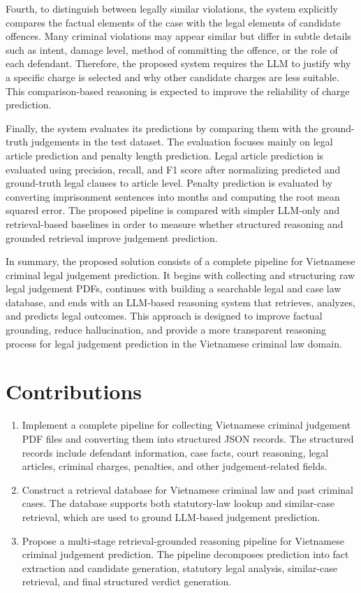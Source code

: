 \documentclass[../main.tex]{subfiles}
\begin{document}
Fourth, to distinguish between legally similar violations, the system explicitly compares the factual elements of the case with the legal elements of candidate offences. Many criminal violations may appear similar but differ in subtle details such as intent, damage level, method of committing the offence, or the role of each defendant. Therefore, the proposed system requires the LLM to justify why a specific charge is selected and why other candidate charges are less suitable. This comparison-based reasoning is expected to improve the reliability of charge prediction.

Finally, the system evaluates its predictions by comparing them with the ground-truth judgements in the test dataset. The evaluation focuses mainly on legal article prediction and penalty length prediction. Legal article prediction is evaluated using precision, recall, and F1 score after normalizing predicted and ground-truth legal clauses to article level. Penalty prediction is evaluated by converting imprisonment sentences into months and computing the root mean squared error. The proposed pipeline is compared with simpler LLM-only and retrieval-based baselines in order to measure whether structured reasoning and grounded retrieval improve judgement prediction.

In summary, the proposed solution consists of a complete pipeline for Vietnamese criminal legal judgement prediction. It begins with collecting and structuring raw legal judgement PDFs, continues with building a searchable legal and case law database, and ends with an LLM-based reasoning system that retrieves, analyzes, and predicts legal outcomes. This approach is designed to improve factual grounding, reduce hallucination, and provide a more transparent reasoning process for legal judgement prediction in the Vietnamese criminal law domain.

\section{Contributions}
\begin{enumerate}
\item Implement a complete pipeline for collecting Vietnamese criminal judgement PDF files and converting them into structured JSON records. The structured records include defendant information, case facts, court reasoning, legal articles, criminal charges, penalties, and other judgement-related fields.
\item Construct a retrieval database for Vietnamese criminal law and past criminal cases. The database supports both statutory-law lookup and similar-case retrieval, which are used to ground LLM-based judgement prediction.
\item Propose a multi-stage retrieval-grounded reasoning pipeline for Vietnamese criminal judgement prediction. The pipeline decomposes prediction into fact extraction and candidate generation, statutory legal analysis, similar-case retrieval, and final structured verdict generation.
\end{enumerate}
\end{document}
